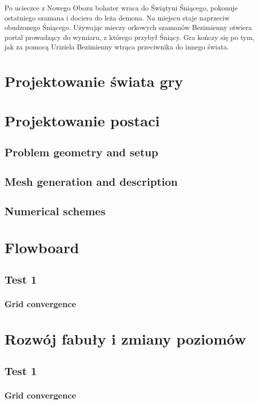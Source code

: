 \documentclass[11pt,polish, openany]{book}
\begin{document}
Po ucieczce z Nowego Obozu bohater wraca do Świątyni Śniącego, pokonuje ostatniego szamana i dociera do leża demona. Na miejscu staje naprzeciw obudzonego Śniącego. Używając mieczy orkowych szamanów Bezimienny otwiera portal prowadzący do wymiaru, z którego przybył Śniący. Gra kończy się po tym, jak za pomocą Uriziela Bezimienny wtrąca przeciwnika do innego świata.

\chapter{Projektowanie świata gry}\label{chapt:doe}
\chapter{Projektowanie postaci}\label{chapt:model}
\section{Problem geometry and setup}
\section{Mesh generation and description}
\section{Numerical schemes}

\chapter{Flowboard}\label{chapt:results}
\section{Test 1}
\subsection{Grid convergence}

\chapter{Rozwój fabuły i zmiany poziomów}\label{chapt:results}
\section{Test 1}
\subsection{Grid convergence}
\end{document}
